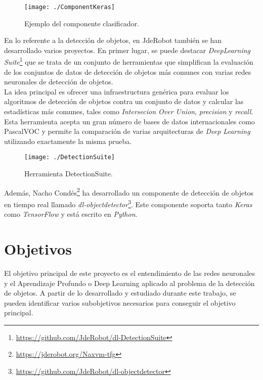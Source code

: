\documentclass[a4paper, 12pt, spanish, chapterprefix, numbers=noenddot]{book}
\begin{document}
\begin{figure}[H]
\begin{center}
\texttt{[image: ./ComponentKeras]}
\caption{Ejemplo del componente clasificador.}
\label{ComponentKeras}
\end{center}
\end{figure}

En lo referente a la detección de objetos, en JdeRobot también se han desarrollado varios proyectos. En primer lugar, se puede destacar \textit{DeepLearning Suite}\footnote{\url{https://github.com/JdeRobot/dl-DetectionSuite}} que se trata de un conjunto de herramientas que simplifican la evaluación de los conjuntos de datos de detección de objetos más comunes con varias redes neuronales de detección de objetos.\\

La idea principal es ofrecer una infraestructura genérica para evaluar los algoritmos de detección de objetos contra un conjunto de datos y calcular las estadísticas más comunes, tales como \textit{Intersecion Over Union}, \textit{precision} y \textit{recall}. Esta herramienta acepta un gran número de bases de datos internacionales como PascalVOC y permite la comparación de varias arquitecturas de \textit{Deep Learning} utilizando exactamente la misma prueba.

\begin{figure}[H]
\begin{center}
\texttt{[image: ./DetectionSuite]}
\caption{Herramienta DetectionSuite.}
\label{DetectionSuite}
\end{center}
\end{figure}

Además, Nacho Condés\footnote{\url{https://jderobot.org/Naxvm-tfg}} ha desarrollado un componente de detección de objetos en tiempo real llamado \textit{dl-objectdetector}\footnote{\url{https://github.com/JdeRobot/dl-objectdetector}}. Este componente soporta tanto \textit{Keras} como \textit{TensorFlow} y está escrito en \textit{Python}.

\section{Objetivos}\label{Objetivos}

El objetivo principal de este proyecto es el entendimiento de las redes neuronales y el Aprendizaje Profundo o Deep Learning aplicado al problema de la detección de objetos. A partir de lo desarrollado y estudiado durante este trabajo, se pueden identificar varios subobjetivos necesarios para conseguir el objetivo principal. 
\end{document}
